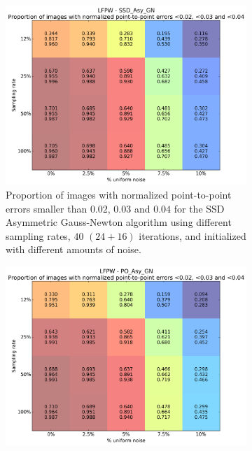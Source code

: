 \begin{figure}[p]
	\centering
	\begin{subfigure}{0.48\textwidth}
	    \includegraphics[width=\textwidth]{experiments/sampling/sampling_vs_noise_ssd_asy_gn.png}
	    \caption{Proportion of images with normalized point-to-point errors smaller than $0.02$, $0.03$ and $0.04$ for the SSD Asymmetric Gauss-Newton algorithm using different sampling rates, $40$ $(24 + 16)$ iterations, and initialized with different amounts of noise.}
	    \label{fig:sampling_vs_noise_ssd_asy_gn}
	\end{subfigure}
	\hfill
	\begin{subfigure}{0.48\textwidth}
	    \includegraphics[width=\textwidth]{experiments/sampling/sampling_vs_noise_po_asy_gn.png}

\end{subfigure}
\end{figure}
